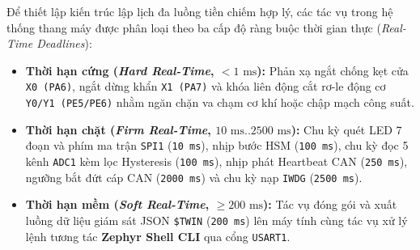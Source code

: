 Để thiết lập kiến trúc lập lịch đa luồng tiền chiếm hợp lý, các tác vụ trong hệ thống thang máy được phân loại theo ba cấp độ ràng buộc thời gian thực (\textit{Real-Time Deadlines}):
\begin{itemize}[nosep]
    \item \textbf{Thời hạn cứng (\textit{Hard Real-Time}, $< 1\text{ ms}$):} Phản xạ ngắt chống kẹt cửa \texttt{X0 (PA6)}, ngắt dừng khẩn \texttt{X1 (PA7)} và khóa liên động cắt rơ-le động cơ \texttt{Y0/Y1 (PE5/PE6)} nhằm ngăn chặn va chạm cơ khí hoặc chập mạch công suất.
    \item \textbf{Thời hạn chặt (\textit{Firm Real-Time}, $10\text{ ms} .. 2500\text{ ms}$):} Chu kỳ quét LED 7 đoạn và phím ma trận \texttt{SPI1} (\texttt{10~ms}), nhịp bước HSM (\texttt{100~ms}), chu kỳ đọc 5 kênh \texttt{ADC1} kèm lọc Hysteresis (\texttt{100~ms}), nhịp phát Heartbeat CAN (\texttt{250~ms}), ngưỡng bắt đứt cáp CAN (\texttt{2000~ms}) và chu kỳ nạp \texttt{IWDG} (\texttt{2500~ms}).
    \item \textbf{Thời hạn mềm (\textit{Soft Real-Time}, $\ge 200\text{ ms}$):} Tác vụ đóng gói và xuất luồng dữ liệu giám sát JSON \texttt{\$TWIN} (\texttt{200~ms}) lên máy tính cùng tác vụ xử lý lệnh tương tác \textbf{Zephyr Shell CLI} qua cổng \texttt{USART1}.
\end{itemize}

\clearpage
